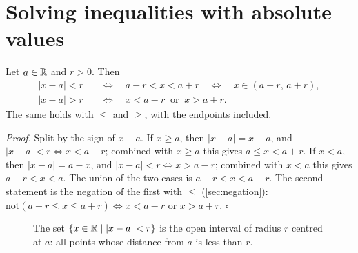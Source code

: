 \section{Solving inequalities with absolute values}\label{sec:abs-ineq}

\begin{proposition}
Let $a\in\mathbb{R}$ and $r>0$. Then
\begin{align*}
|x-a|<r\quad&\Longleftrightarrow\quad a-r<x<a+r\quad\Longleftrightarrow\quad x\in(a-r,\,a+r),\\
|x-a|>r\quad&\Longleftrightarrow\quad x<a-r\ \text{ or }\ x>a+r.
\end{align*}
The same holds with $\le$ and $\ge$, with the endpoints included.
\end{proposition}
\emph{Proof.} Split by the sign of $x-a$. If $x\ge a$, then $|x-a|=x-a$, and $|x-a|<r\Leftrightarrow x<a+r$; combined
with $x\ge a$ this gives $a\le x<a+r$. If $x<a$, then $|x-a|=a-x$, and $|x-a|<r\Leftrightarrow x>a-r$; combined with
$x<a$ this gives $a-r<x<a$. The union of the two cases is $a-r<x<a+r$. The second statement is the negation of
the first with $\le$ (\cref{sec:negation}): $\text{not}(a-r\le x\le a+r)\Leftrightarrow x<a-r$ or $x>a+r$.
\hfill$\square$

\begin{figure}[ht]
\centering
{}
\caption{The set $\{x\in\mathbb{R}\mid |x-a|<r\}$ is the open interval of radius $r$ centred at $a$: all points whose
distance from $a$ is less than $r$.}
\label{fig:abs-interval}
\end{figure}

